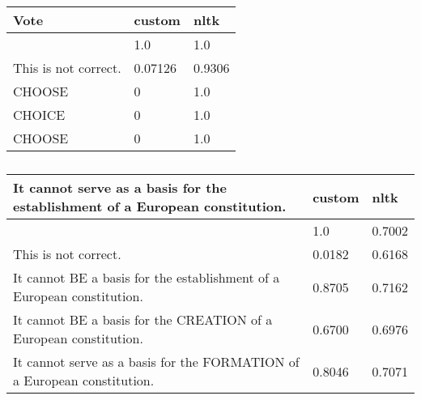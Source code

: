 \documentclass[a4paper]{article}
\begin{document}
\begin{table}
  \begin{tabular}{l l l}
    \toprule
    Vote & custom & nltk \\
    \midrule 
         & 1.0 & 1.0 \\
    This is not correct. & 0.07126 & 0.9306 \\
    CHOOSE & 0 & 1.0 \\
    CHOICE & 0 & 1.0 \\
    CHOOSE & 0 & 1.0 \\
    \bottomrule
  \end{tabular}
  \caption{}
\end{table}

\begin{table}
  \begin{tabular}{l l l}
    \toprule
    It cannot serve as a basis for the establishment of a European constitution. & custom & nltk \\
    \midrule
                                                                                 & 1.0 & 0.7002 \\
    This is not correct. & 0.0182 & 0.6168 \\
    It cannot BE a basis for the establishment of a European constitution. & 0.8705 & 0.7162 \\
    It cannot BE a basis for the CREATION of a European constitution. & 0.6700 & 0.6976 \\
    It cannot serve as a basis for the FORMATION of a European constitution. & 0.8046 & 0.7071 \\
    \bottomrule
  \end{tabular}
  \caption{}
\end{table}

\begin{table}
  \caption{}
\end{table}
\end{document}
